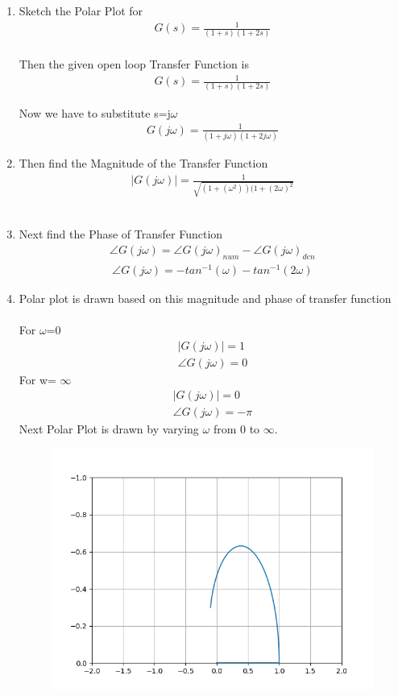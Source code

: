 \begin{enumerate}[label=\thesection.\arabic*.,ref=\thesection.\theenumi]
\item
Sketch the Polar Plot for
\begin{align}
G(s) = \frac{1}{(1+s)(1+2s)}
\end{align}
\\
\solution  Then the given open loop Transfer Function is
\begin{align}
G(s) = \frac{1}{(1+s)(1+2s)}
\end{align}

Now we have to substitute s=j$\omega$\\
\begin{align}
G(j\omega) = \frac{1}{(1+j\omega)(1+2j\omega)} 
\end{align}
\item
Then find the Magnitude of the Transfer Function
\\
\solution
\begin{multline}
      |G(j\omega)| = \frac{1}{\sqrt{(1+(\omega^2))(1+(2\omega)^2}}
\end{multline}\\
\item
Next find the Phase of Transfer Function\\
\solution
\begin{align}
    \angle G(j\omega) = \angle G(j\omega)_{num} - \angle G(j\omega)_{den}
\end{align}
\begin{multline}
    \angle G(j\omega) = -tan^{-1}(\omega)-tan^{-1}(2\omega)
\end{multline}
\item
Polar plot is drawn based on this magnitude and phase of transfer function\\
\solution\\
For $\omega$=0 
\begin{align}
    |G(j\omega)| = 1\\
    \angle G(j\omega) = 0
\end{align}
For w= $\infty$
\begin{align}
    |G(j\omega)| = 0\\
    \angle G(j\omega) = -\pi
\end{align}
Next Polar Plot is drawn by varying $\omega$ from 0 to $\infty$.\\
\begin{figure}
    \centering
    \includegraphics[width=0.7\linewidth]{Polarplot_A1(a).png}

\end{figure}
\end{enumerate}
